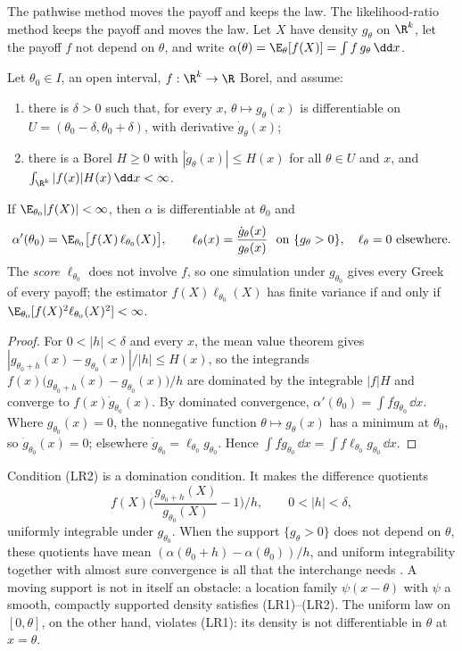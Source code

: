 The pathwise method moves the payoff and keeps the law. The likelihood-ratio method keeps the
payoff and moves the law. Let $X$ have density $g_\theta$ on $\R^k$, let the payoff $f$ not
depend on $\theta$, and write $\alpha(\theta)=\E_\theta[f(X)]=\int f\,g_\theta\,\dd x$.

\begin{theorem}\label{thm:gr-likelihood-ratio}
Let $\theta_0\in I$, an open interval, $f:\R^k\to\R$ Borel, and assume:
\begin{enumerate}[label=(LR\arabic*)]
  \item there is $\delta>0$ such that, for every $x$, $\theta\mapsto g_\theta(x)$ is
    differentiable on $U=(\theta_0-\delta,\theta_0+\delta)$, with derivative
    $\dot g_\theta(x)$;
  \item there is a Borel $H\ge0$ with $|\dot g_\theta(x)|\le H(x)$ for all $\theta\in U$ and $x$, and
    $\int_{\R^k}|f(x)|H(x)\,\dd x<\infty$.
\end{enumerate}
If $\E_{\theta_0}|f(X)|<\infty$, then $\alpha$ is differentiable at $\theta_0$ and
\[
  \alpha'(\theta_0)=\E_{\theta_0}\big[f(X)\,\ell_{\theta_0}(X)\big],\qquad
  \ell_\theta(x)=\frac{\dot g_\theta(x)}{g_\theta(x)}\ \text{ on }\{g_\theta>0\},\quad\ell_\theta=0\ \text{elsewhere}.
\]
The \emph{score} $\ell_{\theta_0}$ does not involve $f$, so one simulation under $g_{\theta_0}$
gives every Greek of every payoff; the estimator $f(X)\ell_{\theta_0}(X)$ has finite variance
if and only if $\E_{\theta_0}[f(X)^2\ell_{\theta_0}(X)^2]<\infty$.
\end{theorem}

\begin{proof}
For $0<|h|<\delta$ and every $x$, the mean value theorem gives
$|g_{\theta_0+h}(x)-g_{\theta_0}(x)|/|h|\le H(x)$, so the integrands
$f(x)\big(g_{\theta_0+h}(x)-g_{\theta_0}(x)\big)/h$ are dominated by the integrable $|f|H$ and
converge to $f(x)\dot g_{\theta_0}(x)$. By dominated convergence,
$\alpha'(\theta_0)=\int f\dot g_{\theta_0}\,\dd x$. Where $g_{\theta_0}(x)=0$, the nonnegative
function $\theta\mapsto g_\theta(x)$ has a minimum at $\theta_0$, so $\dot g_{\theta_0}(x)=0$;
elsewhere $\dot g_{\theta_0}=\ell_{\theta_0}g_{\theta_0}$. Hence
$\int f\dot g_{\theta_0}\,\dd x=\int f\ell_{\theta_0}g_{\theta_0}\,\dd x$.
\end{proof}

Condition (LR2) is a domination condition. It makes the difference quotients
\[
  f(X)\Big(\frac{g_{\theta_0+h}(X)}{g_{\theta_0}(X)}-1\Big)\Big/h,\qquad 0<|h|<\delta,
\]
uniformly integrable under $g_{\theta_0}$. When the support $\{g_\theta>0\}$ does not depend on
$\theta$, these quotients have mean $(\alpha(\theta_0+h)-\alpha(\theta_0))/h$, and uniform
integrability together with almost sure convergence is all that the interchange needs
\citep[Section~4.6]{durrett}. A moving support is not in itself an obstacle: a location family
$\psi(x-\theta)$ with $\psi$ a smooth, compactly supported density satisfies (LR1)--(LR2). The
uniform law on $[0,\theta]$, on the other hand, violates (LR1): its density is not differentiable
in $\theta$ at $x=\theta$.

